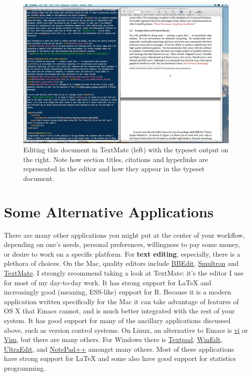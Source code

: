 \documentclass[11pt,article,oneside]{memoir}
\begin{document}
\begin{figure}[ht]
	\centering
		\includegraphics[scale=0.2]{figures/TextMateLaTeX}
	\caption{Editing this document in TextMate (left) with the typeset output on the right. Note how section titles, citations and hyperlinks are represented in the editor and how they appear in the typeset document.}
	\label{fig:label}
\end{figure}

\section{Some Alternative Applications}
There are many other applications you might put at the center of your workflow, depending on one's needs, personal preferences, willingness to pay some money, or desire to work on a specific platform. For \textbf{text editing}, especially, there is a plethora of choices. On the Mac, quality editors  include
\href{http://www.barebones.com/products/bbedit/index.shtml}{BBEdit}, \href{http://smultron.sourceforge.net/}{Smultron} and \href{http://macromates.com/}{TextMate}. I strongly recommend taking a look at TextMate: it's the editor I use for most of my day-to-day work. It has strong support for LaTeX and increasingly good (meaning, ESS-like) support for R. Because it is a modern application written specifically for the Mac it can take advantage of features of OS X that Emacs cannot, and is much better integrated with the rest of your system. It has good support for many of the ancillary applications discussed above, such as version control systems. On Linux, an alternative to Emacs is \href{http://www.eng.hawaii.edu/Tutor/vi.html}{vi} or \href{http://www.vim.org/}{Vim}, but there are many others. For Windows there is \href{http://www.textpad.com/}{Textpad}, \href{http://www.winedt.com/}{WinEdt}, \href{http://www.ultraedit.com/}{UltraEdit}, and \href{http://notepad-plus.sourceforge.net/uk/site.htm}{NotePad++} amongst many others. Most of these applications have strong support for LaTeX and some also have good support for statistics programming.
\end{document}
